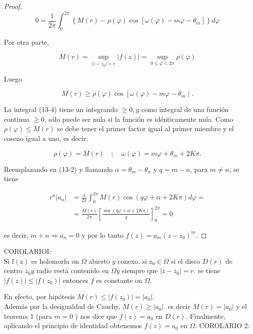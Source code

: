 \documentclass[10pt]{article}
\theoremstyle{plain}
\theoremstyle{definition}
\theoremstyle{remark}
\begin{document}
\begin{proof}
\begin{equation*}
0=\frac{1}{2 \pi} \int_{0}^{2 \pi}\left\{M(r)-\rho(\varphi) \cos \left[\omega(\varphi)-m \varphi-\theta_{m}\right]\right\} d \varphi \tag{13-4}
\end{equation*}


Por otra parte,

$$
M(r)=\sup _{\left|z-z_{0}\right|=r}|f(z)|=\sup _{0 \leqslant \varphi<2 \pi} \rho(\varphi)
$$

Luego

$$
M(r) \geqslant \rho(\varphi) \cos \left[\omega(\varphi)-m \varphi-\theta_{m} \mid .\right.
$$

La integral (13-4) tiene un integrando $\geqslant 0, y$ como integral de una función continua $\geqslant 0$, sólo puede ser nula si la función es idénticamente nula. Como $\rho(\varphi) \leqslant M(r)$ se debe tener el primer factor igual al primer miembro y el coseno igual a uno, es decir:

$$
\rho(\varphi)=M(r) \quad ; \quad \omega(\varphi)=m \varphi+\theta_{m}+2 K \pi .
$$

Reemplazando en (13-2) y llamando $\alpha=\theta_{m}-\theta_{n}$ y $q=m-n$, para $m \neq n$, se tiene


$$
\begin{aligned}
r^{n}\left|a_{n}\right| & =\frac{1}{2 \pi} \int_{0}^{2 \pi} M(r) \cos (q \varphi+\alpha+2 K \pi) d \varphi= \\
& =\frac{M(r)}{2 \pi}\left[\frac{\operatorname{sen}(q \varphi+\alpha+2 K \pi)}{q}\right]_{0}^{2 \pi}=0
\end{aligned}
$$

es decir, $m+n \Rightarrow a_{n}=0$ y por lo tanto $f(z)=a_{m}\left(z-z_{0}\right)^{m}$.
\end{proof}


COROLARIOI:\\
Si $\mathrm{f}(\mathrm{z})$ es holomorfa on $\Omega$ abierto $y$ conexo. si $\mathrm{z}_{0} \in \Omega$ si el disco $D(r)$ de centro $z_{0} y$ radio restá contenido en $\Omega y$ siempre que $\left|z-z_{0}\right|=r$. se tiene $|f(z)| \leqslant\left|f\left(z_{0}\right)\right|$ entonces $f$ es constante on $\Omega$.

En efecto, por hipótesis $M(r) \leqslant\left|f\left(z_{0}\right)\right|=\left|a_{0}\right|$.\\
Además por la desigualdad de Cauchy, $M(r) \geqslant\left|a_{0}\right|$. es decir $M(r)=\left|a_{0}\right|$ y el teorema 1 (para $m=0$ ) nos dice que $f(z)=a_{0}$ en $D(r)$. Finalmente, aplicando el principio de identidad obtenemos $f(z)=a_{0}$ en $\Omega$. COROLARIO 2:
\end{document}
